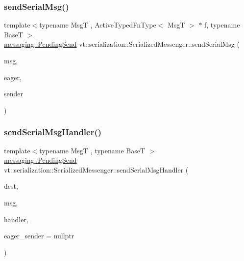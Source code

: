 \subsubsection{\texorpdfstring{send\+Serial\+Msg()}{sendSerialMsg()}\hspace{0.1cm}{\footnotesize\ttfamily [3/3]}}
{\footnotesize\ttfamily template$<$typename MsgT , Active\+Typed\+Fn\+Type$<$ Msg\+T $>$ $\ast$ f, typename BaseT $>$ \\
\hyperlink{structvt_1_1messaging_1_1_pending_send}{messaging\+::\+Pending\+Send} vt\+::serialization\+::\+Serialized\+Messenger\+::send\+Serial\+Msg (\begin{DoxyParamCaption}\item[{MsgT $\ast$}]{msg,  }\item[{\hyperlink{namespacevt_1_1serialization_a009aa1de8d42a3c97643b947fcc6f0b6}{Action\+Eager\+Send}$<$ MsgT, BaseT $>$}]{eager,  }\item[{\hyperlink{namespacevt_1_1serialization_afffcac0da80b78e77ef8043dba4e814f}{Action\+Data\+Send}}]{sender }\end{DoxyParamCaption})\hspace{0.3cm}{\ttfamily [static]}}

\mbox{\label{structvt_1_1serialization_1_1_serialized_messenger_a550f29c7e7773b9547cd6ecf57c92c96}} 
\subsubsection{\texorpdfstring{send\+Serial\+Msg\+Handler()}{sendSerialMsgHandler()}\hspace{0.1cm}{\footnotesize\ttfamily [1/2]}}
{\footnotesize\ttfamily template$<$typename MsgT , typename BaseT $>$ \\
\hyperlink{structvt_1_1messaging_1_1_pending_send}{messaging\+::\+Pending\+Send} vt\+::serialization\+::\+Serialized\+Messenger\+::send\+Serial\+Msg\+Handler (\begin{DoxyParamCaption}\item[{\hyperlink{namespacevt_a866da9d0efc19c0a1ce79e9e492f47e2}{Node\+Type}}]{dest,  }\item[{MsgT $\ast$}]{msg,  }\item[{\hyperlink{namespacevt_af64846b57dfcaf104da3ef6967917573}{Handler\+Type} const \&}]{handler,  }\item[{\hyperlink{namespacevt_1_1serialization_a009aa1de8d42a3c97643b947fcc6f0b6}{Action\+Eager\+Send}$<$ MsgT, BaseT $>$}]{eager\+\_\+sender = {\ttfamily nullptr} }\end{DoxyParamCaption})\hspace{0.3cm}{\ttfamily [static]}}

